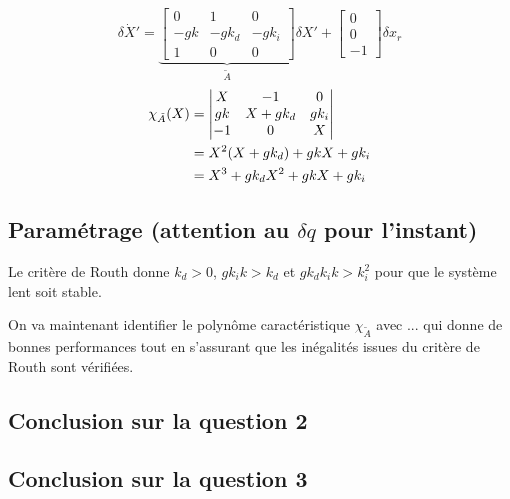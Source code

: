 \documentclass[10pt]{article}
\begin{document}
\[
	\delta \dot X' = \underbrace{
	\begin{bmatrix}
		0 & 1 & 0 \\
		- g k & - g k_d & - g k_i \\
		1 & 0 & 0
	\end{bmatrix}
	}_{\tilde A}
	\delta X'
	+
	\begin{bmatrix}
		0 \\
		0 \\
		- 1
	\end{bmatrix}
	\delta x_r
\]
\begin{align}
	\chi_{\tilde A} ( X) &=
	\begin{vmatrix}
		X & - 1 & 0 \\
		g k & X + g k_d & g k_i \\
		- 1 & 0 & X
	\end{vmatrix} \notag \\
	&= X^2 ( X + g k_d ) + g k X + g k_i \notag \\
	&= X^3 + g k_d X^2 + g k X + g k_i \notag
\end{align}

\subsection*{Paramétrage (attention au $\delta q$ pour l'instant)}

\noindent Le critère de Routh donne $k_d > 0$, $g k_i k > k_d$ et $g k_d k_i k > k_i^2$ pour que le système lent
soit stable.

\vspace{10px}

\noindent On va maintenant identifier le polynôme caractéristique $\chi_{\tilde A}$ avec ... qui donne de bonnes
performances tout en s'assurant que les inégalités issues du critère de Routh sont vérifiées.

\subsection*{Conclusion sur la question 2}


\subsection*{Conclusion sur la question 3}

\end{document}
